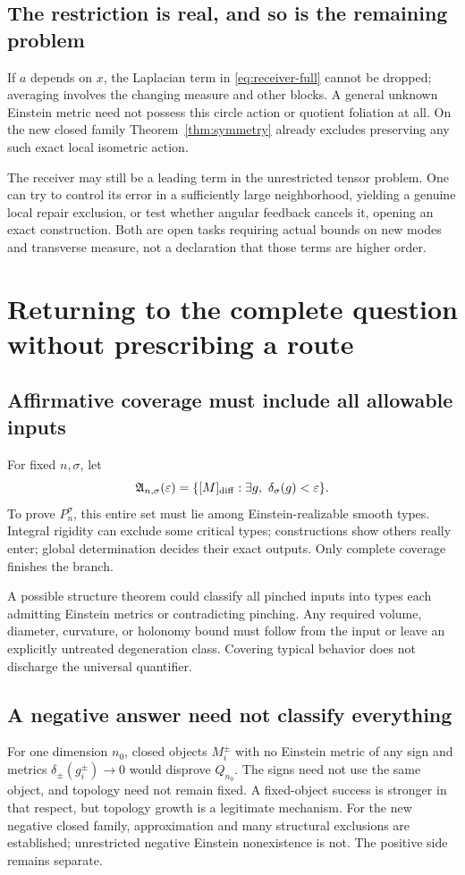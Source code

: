 \documentclass[11pt]{article}
\theoremstyle{definition}\newtheorem{problem}[theorem]{Open problem}
\theoremstyle{remark}\newtheorem{remark}[theorem]{Scope}
\numberwithin{equation}{section}
\begin{document}
\subsection{The restriction is real, and so is the remaining problem}\label{sec:repair-scope}
If $a$ depends on $x$, the Laplacian term in \eqref{eq:receiver-full} cannot be dropped; averaging involves the changing measure and other blocks. A general unknown Einstein metric need not possess this circle action or quotient foliation at all. On the new closed family Theorem~\ref{thm:symmetry} already excludes preserving any such exact local isometric action.

The receiver may still be a leading term in the unrestricted tensor problem. One can try to control its error in a sufficiently large neighborhood, yielding a genuine local repair exclusion, or test whether angular feedback cancels it, opening an exact construction. Both are open tasks requiring actual bounds on new modes and transverse measure, not a declaration that those terms are higher order.

\section{Returning to the complete question without prescribing a route}\label{sec:closure}
\subsection{Affirmative coverage must include all allowable inputs}\label{sec:affirmative}
For fixed $n,\sigma$, let
\[
 \mathfrak A_{n,\sigma}(\varepsilon)=
 \{[M]_{\rm diff}:\exists g,\ \delta_\sigma(g)<\varepsilon\}.
\]
To prove $P_n^\sigma$, this entire set must lie among Einstein-realizable smooth types. Integral rigidity can exclude some critical types; constructions show others really enter; global determination decides their exact outputs. Only complete coverage finishes the branch.

A possible structure theorem could classify all pinched inputs into types each admitting Einstein metrics or contradicting pinching. Any required volume, diameter, curvature, or holonomy bound must follow from the input or leave an explicitly untreated degeneration class. Covering typical behavior does not discharge the universal quantifier.

\subsection{A negative answer need not classify everything}\label{sec:negative}
For one dimension $n_0$, closed objects $M_i^\pm$ with no Einstein metric of any sign and metrics $\delta_\pm(g_i^\pm)\to0$ would disprove $Q_{n_0}$. The signs need not use the same object, and topology need not remain fixed. A fixed-object success is stronger in that respect, but topology growth is a legitimate mechanism. For the new negative closed family, approximation and many structural exclusions are established; unrestricted negative Einstein nonexistence is not. The positive side remains separate.
\end{document}
